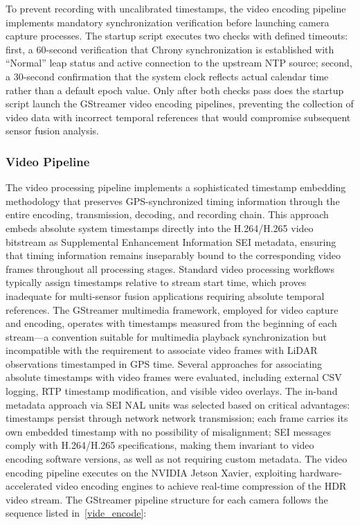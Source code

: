 To prevent recording with uncalibrated timestamps, the video encoding pipeline implements mandatory synchronization verification before launching camera capture processes. The startup script executes two checks with defined timeouts: first, a 60-second verification that Chrony synchronization is established with ``Normal'' leap status and active connection to the upstream \ac{NTP} source; second, a 30-second confirmation that the system clock reflects actual calendar time rather than a default epoch value. Only after both checks pass does the startup script launch the GStreamer video encoding pipelines, preventing the collection of video data with incorrect temporal references that would compromise subsequent sensor fusion analysis.
            
\subsubsection{Video Pipeline} \label{video pipeline}
            
The video processing pipeline implements a sophisticated timestamp embedding methodology that preserves GPS-synchronized timing information through the entire encoding, transmission, decoding, and recording chain. This approach embeds absolute system timestamps directly into the H.264/H.265 video bitstream as Supplemental Enhancement Information \ac{SEI} metadata, ensuring that timing information remains inseparably bound to the corresponding video frames throughout all processing stages.
Standard video processing workflows typically assign timestamps relative to stream start time, which proves inadequate for multi-sensor fusion applications requiring absolute temporal references. The GStreamer multimedia framework, employed for video capture and encoding, operates with timestamps measured from the beginning of each stream---a convention suitable for multimedia playback synchronization but incompatible with the requirement to associate video frames with LiDAR observations timestamped in GPS time. Several approaches for associating absolute timestamps with video frames were evaluated, including external CSV logging, \ac{RTP} timestamp modification, and visible video overlays. The in-band metadata approach via \ac{SEI} \ac{NAL} units was selected based on critical advantages: timestamps persist through network network transmission; each frame carries its own embedded timestamp with no possibility of misalignment; \ac{SEI} messages comply with H.264/H.265 specifications, making them invariant to video encoding software versions, as well as not requiring custom metadata.
The video encoding pipeline executes on the NVIDIA Jetson Xavier, exploiting hardware-accelerated video encoding engines to achieve real-time compression of the HDR video stream. The GStreamer pipeline structure for each camera follows the sequence listed in~\ref{vide_encode}: 

